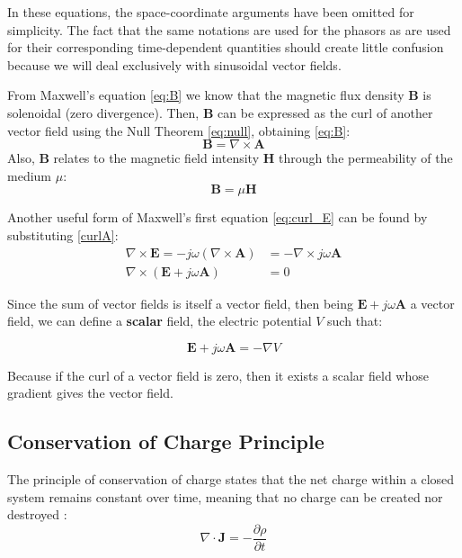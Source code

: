 In these equations, the space-coordinate arguments have been omitted for simplicity. The fact that the same notations are used for the phasors as are used for their corresponding time-dependent quantities should create little confusion because we will deal exclusively with sinusoidal vector fields.

From Maxwell's equation \ref{eq:B} we know that the magnetic flux density \(\mathbf{B}\) is solenoidal (zero divergence).
Then, \(\mathbf{B}\) can be expressed as the curl of another vector field using the Null Theorem \ref{eq:null}, obtaining \ref{eq:B}:
\begin{equation}
\mathbf{B} = \nabla \times \mathbf{A}
\label{curlA}
\end{equation}
Also, \(\mathbf{B}\) relates to the magnetic field intensity \(\mathbf{H}\) through the permeability of the medium \(\mu\):
\begin{equation}
\mathbf{B} = \mu \mathbf{H}
\label{eq:BH}
\end{equation}

Another useful form of Maxwell's first equation \ref{eq:curl_E} can be found by substituting \ref{curlA}:
\begin{align}
\nabla \times \mathbf{E} = - j \omega (\nabla \times \mathbf{A}) &= -\nabla \times j \omega \mathbf{A} \nonumber 
\\[7pt]
\nabla \times \left(\mathbf{E} + j \omega \mathbf{A}\right) &= 0 \nonumber
\end{align}

Since the sum of vector fields is itself a vector field, then being  \(\mathbf{E} +  j \omega \mathbf{A}\) a vector field, we can define a \textbf{scalar} field, the electric potential \( V \) such that:

\begin{equation}
\mathbf{E} + j \omega \mathbf{A} = -\nabla V
\label{eq:V}
\end{equation}

Because if the curl of a vector field is zero, then it exists a scalar field whose gradient gives the vector field. 

\subsection{Conservation of Charge Principle}
The principle of conservation of charge states that the net charge within a closed system remains constant over time, meaning that no charge can be created nor destroyed \cite{book-magnetism}:
\begin{equation}
\nabla \cdot \mathbf{J} = -\frac{\partial \rho}{\partial t}
\end{equation}

